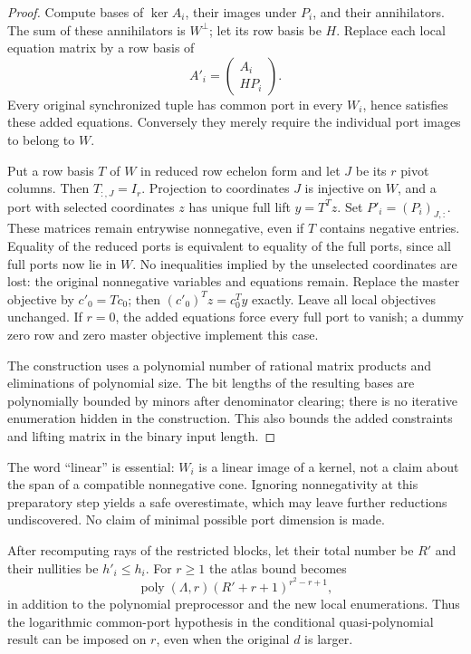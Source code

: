 \begin{proof}
Compute bases of $\ker A_i$, their images under $P_i$, and their
annihilators.  The sum of these annihilators is $W^\perp$; let its row
basis be $H$.  Replace each local equation matrix by a row basis of
\[
 A'_i=\begin{pmatrix}A_i\\ HP_i\end{pmatrix}.
\]
Every original synchronized tuple has common port in every $W_i$,
hence satisfies these added equations.  Conversely they merely require
the individual port images to belong to $W$.

Put a row basis $T$ of $W$ in reduced row echelon form and let $J$ be
its $r$ pivot columns.  Then $T_{:,J}=I_r$.  Projection to coordinates
$J$ is injective on $W$, and a port with selected coordinates $z$ has
unique full lift $y=T^Tz$.  Set $P'_i=(P_i)_{J,:}$.  These matrices
remain entrywise nonnegative, even if $T$ contains negative entries.
Equality of the reduced ports is equivalent to equality of the full
ports, since all full ports now lie in $W$.  No inequalities implied by
the unselected coordinates are lost: the original nonnegative variables
and equations remain.  Replace the master objective by $c'_0=Tc_0$;
then $(c'_0)^Tz=c_0^Ty$ exactly.  Leave all local objectives unchanged.
If $r=0$, the added equations force every full port to vanish; a dummy
zero row and zero master objective implement this case.

The construction uses a polynomial number of rational matrix products
and eliminations of polynomial size.  The bit lengths of the resulting
bases are polynomially bounded by minors after denominator clearing;
there is no iterative enumeration hidden in the construction.  This
also bounds the added constraints and lifting matrix in the binary
input length.
\end{proof}

The word ``linear'' is essential: $W_i$ is a linear image of a kernel,
not a claim about the span of a compatible nonnegative cone.  Ignoring
nonnegativity at this preparatory step yields a safe overestimate, which
may leave further reductions undiscovered.  No claim of minimal
possible port dimension is made.

\begin{corollary}
After recomputing rays of the restricted blocks, let their total number
be $R'$ and their nullities be $h'_i\leq h_i$.  For $r\geq1$ the atlas
bound becomes
\[
 \operatorname{poly}(\Lambda,r)(R'+r+1)^{r^2-r+1},
\]
in addition to the polynomial preprocessor and the new local
enumerations.  Thus the logarithmic common-port hypothesis in the
conditional quasi-polynomial result can be imposed on $r$, even when
the original $d$ is larger.
\end{corollary}

